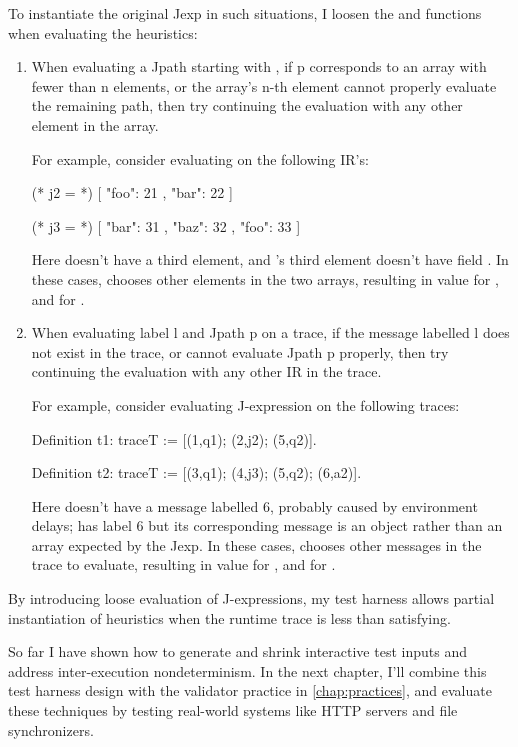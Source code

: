 To instantiate the original Jexp in such situations, I loosen the
 and  functions when evaluating the heuristics:
\begin{enumerate}
\item When evaluating a Jpath starting with , if \ilj p corresponds to
  an array with fewer than \ilj n elements, or the array's \ilj n-th element
  cannot properly evaluate the remaining path, then try continuing the
  evaluation with any other element in the array.

  For example, consider evaluating  on the following IR's:
  \begin{center}
\begin{minipage}[t]{.5\linewidth}
\begin{json}
  (* j2 = *)
  [
    { "foo": 21 },
    { "bar": 22 }
  ]
\end{json}
\end{minipage}\begin{minipage}[t]{.5\linewidth}
\begin{json}
  (* j3 = *)
  [
    { "bar": 31 },
    { "baz": 32 },
    { "foo": 33 }
  ]
\end{json}
\end{minipage}
  \end{center}

  Here  doesn't have a third element, and 's third element
  doesn't have field .  In these cases,  chooses other
  elements in the two arrays, resulting in value  for , and
   for .
  
\item When evaluating label \ilj l and Jpath \ilj p on a trace, if the message
  labelled \ilj l does not exist in the trace, or cannot evaluate Jpath \ilj p
  properly, then try continuing the evaluation with any other IR in the trace.

  For example, consider evaluating J-expression  on the
  following traces:
\begin{coq}
  Definition t1: traceT :=
    [(1,q1); (2,j2); (5,q2)].

  Definition t2: traceT :=
    [(3,q1); (4,j3); (5,q2); (6,a2)].
\end{coq}

Here  doesn't have a message labelled 6, probably caused by environment
delays;  has label 6 but its corresponding message is an object rather
than an array expected by the Jexp.  In these cases,  chooses other
messages in the trace to evaluate, resulting in value  for , and
 for .
\end{enumerate}

By introducing loose evaluation of J-expressions, my test harness allows partial
instantiation of heuristics when the runtime trace is less than satisfying.

So far I have shown how to generate and shrink interactive test inputs and
address inter-execution nondeterminism.  In the next chapter, I'll combine this
test harness design with the validator practice in \autoref{chap:practices}, and
evaluate these techniques by testing real-world systems like HTTP servers and
file synchronizers.
